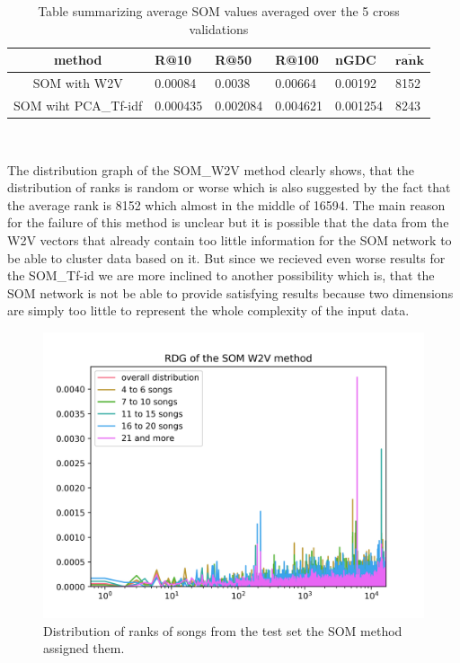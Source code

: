 \begin{table}[hbt!]
\centering
\renewcommand{\arraystretch}{1.5}
\begin{tabu} to 1\textwidth { | c || X[c] | X[c] | X[c] | X[c] | X[c] |}
 \hline
 \textbf{method} & \textbf{R@10} & \textbf{R@50} & \textbf{R@100} & \textbf{nGDC} & $ \boldsymbol{\overline{rank}} $ \\
 \hline
 \hline
 SOM with W2V & 0.00084 & 0.0038 & 0.00664 & 0.00192 & 8152 \\
 \hline
 SOM wiht PCA\_Tf-idf & 0.000435 & 0.002084 & 0.004621 & 0.001254 & 8243 \\
 \hline
\end{tabu} \\
\caption{Table summarizing average SOM values averaged over the 5 cross validations}
\label{table:som}
\end{table}
The distribution graph of the SOM\_W2V method clearly shows, that the distribution of ranks is random or worse which is also suggested by the fact that the average rank is 8152 which almost in the middle of 16594. The main reason for the failure of this method is unclear but it is possible that the data from the W2V vectors that already contain too little information for the SOM network to be able to cluster data based on it.  But since we recieved even worse results for the SOM\_Tf-id we are more inclined to another possibility which is, that the SOM network is not be able to provide satisfying results because two dimensions are simply too little to represent the whole complexity of the input data.
\begin{figure}[hbt!]
    \centering
	\includegraphics[width=120mm]{./img/som_w2v_graph.png}
	\caption{Distribution of ranks of songs from the test set the SOM method assigned them.}
	\label{fig:som_distribution}
\end{figure}
